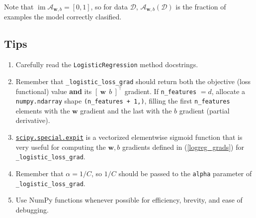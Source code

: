 \documentclass{article}
\numberwithin{equation}{section}
\newcommand{\loglossgrad}{\texttt{\_logistic\_loss\_grad}}
\begin{document}
Note that $ \operatorname{im}\mathcal{A}_{\mathbf{w}, b} = [0, 1] $, so for
data $ \mathcal{D} $, $ \mathcal{A}_{\mathbf{w}, b}(\mathcal{D}) $ is the
fraction of examples the model correctly clasified.

\subsection{Tips}

\begin{enumerate}
    \item
    Carefully read the \texttt{LogisticRegression} method docstrings.

    \item
    Remember that \loglossgrad{} should return both the objective (loss
    functional) value \textbf{and} its $ [ \ \mathbf{w} \ \ b \ ]^\top $
    gradient. If \texttt{n\_features} $ = d $, allocate a
    \texttt{numpy.ndarray} shape \texttt{(n\_features + 1,)}, filling the
    first \texttt{n\_features} elements with the $ \mathbf{w} $ gradient
    and the last with the $ b $ gradient (partial derivative).

    \item
    \href{%
        https://docs.scipy.org/doc/scipy/reference/generated/%
        scipy.special.expit.html%
    }{\texttt{scipy.special.expit}} is a vectorized elementwise sigmoid
    function that is very useful for computing the $ \mathbf{w}, b $
    gradients defined in (\ref{logreg_grads}) for \loglossgrad.

    \item
    Remember that $ \alpha = 1 / C $, so $ 1 / C $ should be passed to the
    \texttt{alpha} parameter of \loglossgrad.

    \item
    Use NumPy functions whenever possible for efficiency, brevity, and ease
    of debugging.
\end{enumerate}
\end{document}
